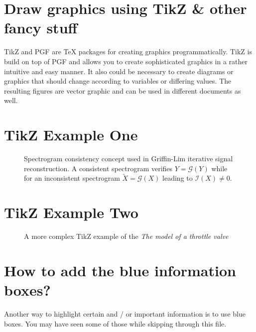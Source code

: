 \section{Draw graphics using TikZ \& other fancy stuff}

TikZ and PGF are TeX packages for creating graphics programmatically. TikZ is build on top of PGF and allows you to create sophisticated graphics in a rather intuitive and easy manner. It also could be necessary to create diagrams or graphics that should change according to variables or differing values. The resulting figures are vector graphic and can be used in different documents as well.

\section{TikZ Example One}

\begin{figure}[h]
	\center %
	\footnotesize{}
	\caption{Spectrogram consistency concept used in Griffin-Lim iterative signal reconstruction. A consistent spectrogram verifies $Y=\mathcal{G}(Y)$ while for an inconsistent spectrogram $\widetilde{X}=\mathcal{G}(X)$ leading to $\mathcal{I}({X})\neq{0}$.}\label{figExOne}
\end{figure}

\begin{mdframed}
	
\end{mdframed}


\section{TikZ Example Two}
\begin{figure}[h]
	\center %
	\footnotesize{}
	\caption{A more complex TikZ example of the \emph{The model of a throttle valve}}\label{figExTwo}
\end{figure}

\begin{mdframed}
	
\end{mdframed}

\section{How to add the blue information boxes?}
Another way to highlight certain and / or important information is to use blue boxes. You may have seen some of those while skipping through this file.

